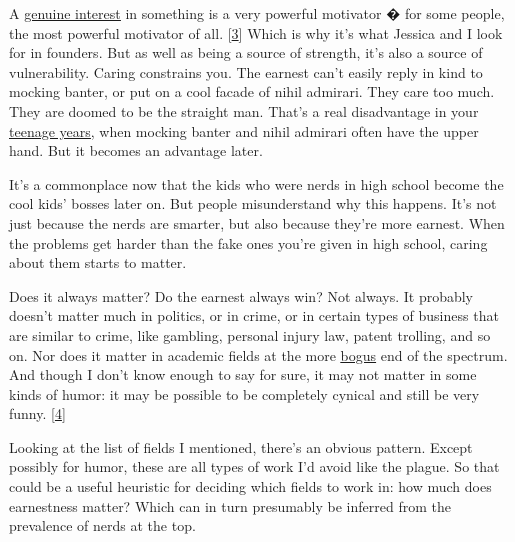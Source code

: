 A
                  \href{http://www.paulgraham.com/genius.html}{\underline{genuine interest}}
                  in something is a very powerful motivator � for some people,
                  the most powerful motivator of all.
                  [\href{\#f3n}{3}]
                  Which is why it's what Jessica and I look for in founders. But
                  as well as being a source of strength, it's also a source of
                  vulnerability. Caring constrains you. The earnest can't easily
                  reply in kind to mocking banter, or put on a cool facade of
                  nihil admirari. They care too much. They are doomed to be the
                  straight man. That's a real disadvantage in your
                  \href{http://www.paulgraham.com/nerds.html}{\underline{teenage years}}, when mocking banter and nihil admirari often have the upper
                  hand. But it becomes an advantage later.

It's a
                  commonplace now that the kids who were nerds in high school
                  become the cool kids' bosses later on. But people
                  misunderstand why this happens. It's not just because the
                  nerds are smarter, but also because they're more earnest. When
                  the problems get harder than the fake ones you're given in
                  high school, caring about them starts to matter.

Does
                  it always matter? Do the earnest always win? Not always. It
                  probably doesn't matter much in politics, or in crime, or in
                  certain types of business that are similar to crime, like
                  gambling, personal injury law, patent trolling, and so on. Nor
                  does it matter in academic fields at the more
                  \href{https://scholar.google.com/scholar?hl=en\&as\_sdt=0\%2C5\&q=hermeneutic+dialectics+hegemonic+phenomenology+intersectionality}{\underline{bogus}}
                  end of the spectrum. And though I don't know enough to say for
                  sure, it may not matter in some kinds of humor: it may be
                  possible to be completely cynical and still be very funny.
                  [\href{\#f4n}{4}]

Looking at the list of fields I mentioned,
                  there's an obvious pattern. Except possibly for humor, these
                  are all types of work I'd avoid like the plague. So that could
                  be a useful heuristic for deciding which fields to work in:
                  how much does earnestness matter? Which can in turn presumably
                  be inferred from the prevalence of nerds at the top.

